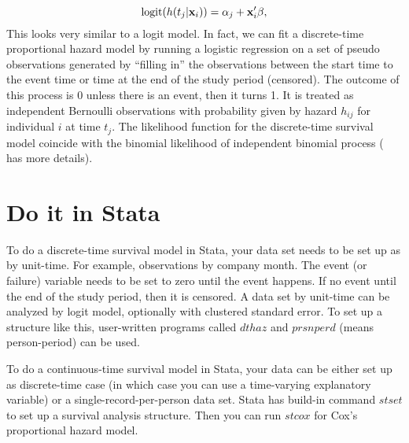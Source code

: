 \begin{equation} 
{\rm logit} (h(t_j | {\bf x}_i)) = \alpha_j +  {\bf x}'_i \beta,
\end{equation}
This looks very similar to a logit model.  In fact, we can fit a
discrete-time proportional hazard model by running a logistic
regression on a set of pseudo observations generated by ``filling in''
the observations between the start time to the event time or time at
the end of the study period (censored).  The outcome of this process
is 0 unless there is an event, then it turns 1.  It is treated as
independent Bernoulli observations with probability given by hazard
$h_{ij}$ for individual $i$ at time $t_j$.  The likelihood function
for the discrete-time survival model coincide with the binomial
likelihood of independent binomial process (\cite{Sing:Will:it's:1993} has more details).

\section{Do it in Stata}

To do a discrete-time survival model in Stata, your data set needs to
be set up as by unit-time.  For example, observations by company
month.  The event (or failure) variable needs to be set to zero until
the event happens.  If no event until the end of the study period,
then it is censored.  A data set by unit-time can be analyzed by logit
model, optionally with clustered standard error.  To set up a
structure like this, user-written programs called $dthaz$ and
$prsnperd$ (means person-period) can be used.


To do a continuous-time survival model in Stata, your data can be
either set up as discrete-time case (in which case you can use a
time-varying explanatory variable) or a single-record-per-person data
set.  Stata has build-in command $stset$ to set up a survival analysis
structure.  Then you can run $stcox$ for Cox's proportional hazard
model.

% 
